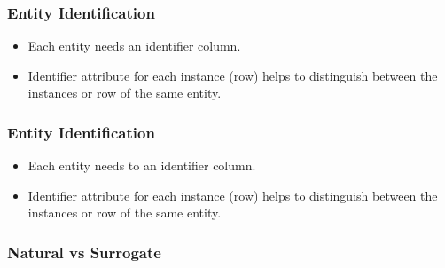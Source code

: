 \begin{frame}
\frametitle{Entity Identification}
	\begin{itemize}[<+->]
		\item Each entity needs an identifier column.
		\item Identifier attribute for each instance (row) helps to distinguish between the instances or row of the same entity.		
	\end{itemize}

\end{frame}
\begin{frame}
	\frametitle{Entity Identification}
	\begin{itemize}
		\item Each entity needs to an identifier column.
		\item Identifier attribute for each instance (row) helps to distinguish between the instances or row of the same entity.		
	\end{itemize}

	\centering
	
	
\end{frame}

\begin{frame}
	\frametitle{Natural vs Surrogate}
	\hspace{.5cm}
\end{frame}


